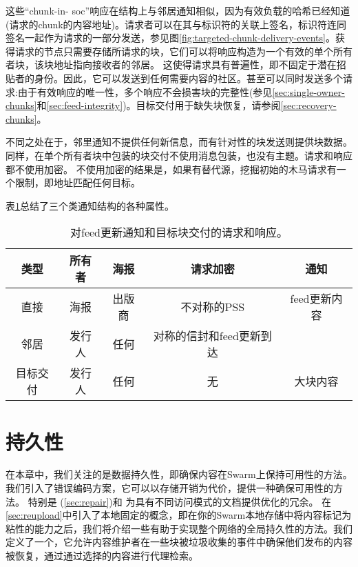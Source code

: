 这些“chunk-in- soc”响应在结构上与邻居通知相似，因为有效负载的哈希已经知道(请求的chunk的内容地址)。请求者可以在其与标识符的关联上签名，标识符连同签名一起作为请求的一部分发送，参见图\ref{fig:targeted-chunk-delivery-events}。获得请求的节点只需要存储所请求的块，它们可以将响应构造为一个有效的单个所有者块，该块地址指向接收者的邻居。
这使得请求具有普遍性，即不固定于潜在招贴者的身份。因此，它可以发送到任何需要内容的社区。甚至可以同时发送多个请求:由于有效响应的唯一性，多个响应不会损害块的完整性(参见\ref{sec:single-owner-chunks}和\ref{sec:feed-integrity})。目标交付用于缺失块恢复，请参阅\ref{sec:recovery-chunks}。

不同之处在于，邻里通知不提供任何新信息，而有针对性的块发送则提供块数据。同样，在单个所有者块中包装的块交付不使用消息包装，也没有主题。请求和响应都不使用加密。
不使用加密的结果是，如果有替代源，挖掘初始的木马请求有一个限制，即地址匹配任何目标。

表\ref{tab:notifications}总结了三个类通知结构的各种属性。

\begin{table}[htpb]
    \centering
    \begin{tabular}{c c c c c | | | | |}
    类型&所有者&海报&请求加密&通知\\\hline
直接&海报&出版商&不对称的PSS & feed更新内容\\
邻居&发行人&任何&对称的信封和feed更新到达\\
目标交付&发行人&任何&无&大块内容\\
    \end{tabular}
    \caption[提要更新通知]{对feed更新通知和目标块交付的请求和响应。}
    \label{tab:notifications}
\end{table}

\chapter{持久性\statusgreen}\label{sec:persistence}


在本章中，我们关注的是数据持久性，即确保内容在Swarm上保持可用性的方法。
我们引入了错误编码方案，它可以以存储开销为代价，提供一种确保可用性的方法。
特别是 (\ref{sec:repair})和 %
为具有不同访问模式的文档提供优化的冗余。
在\ref{sec:reupload}中引入了本地固定的概念，即在你的Swarm本地存储中将内容标记为粘性的能力之后，我们将介绍一些有助于实现整个网络的全局持久性的方法。我们定义了一个，它允许内容维护者在一些块被垃圾收集的事件中确保他们发布的内容被恢复，通过通过选择的内容进行代理检索。

